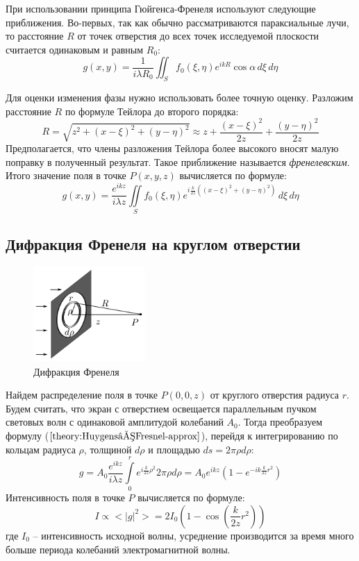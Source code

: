 При использовании принципа Гюйгенса-Френеля используют следующие приближения. Во-первых, так как обычно рассматриваются параксиальные лучи, то расстояние $R$ от точек отверстия до всех точек исследуемой плоскости считается одинаковым и равным $R_0$:
$$
g(x, y) = \frac{1}{i \lambda R_0} \iint_S f_0(\xi, \eta) e^{ikR} \cos \alpha  \, d\xi \, d\eta
$$

Для оценки изменения фазы нужно использовать более точную оценку. Разложим расстояние $R$ по формуле Тейлора до второго порядка:
$$
R = \sqrt{z^2 + (x - \xi)^2 + (y - \eta)^2} \approx z + \frac{(x - \xi)^2}{2 z} + \frac{(y - \eta)^2}{2z}
$$
Предполагается, что члены разложения Тейлора более высокого вносят малую поправку в полученный результат. Такое приближение называется \textit{френелевским}. Итого значение поля в точке $P(x, y, z)$ вычисляется по формуле:
\begin{equation}
	g(x, y) = \frac{e^{ikz}}{i \lambda z} \iint\limits_S f_0(\xi, \eta) e^{i\frac{k}{2z}\left((x-\xi)^2 + (y - \eta)^2\right)} \, d\xi \, d\eta
	\label{theory:Huygens–Fresnel-approx}
\end{equation}

\subsection*{Дифракция Френеля на круглом отверстии}

\begin{figure}
	\centering
	\includegraphics[width=0.38\textwidth]{../Изображения/Дифракция Френеля.png}
	\caption{Дифракция Френеля}
\end{figure}

Найдем распределение поля в точке $P(0, 0, z)$ от круглого отверстия радиуса $r$. Будем считать, что экран с отверстием освещается параллельным пучком световых волн с одинаковой амплитудой колебаний $A_0$. Тогда преобразуем формулу ($\ref{theory:Huygens–Fresnel-approx}$), перейдя к интегрированию по кольцам радиуса $\rho$, толщиной $d\rho$ и площадью $ds = 2 \pi \rho d \rho$:
$$
	g = A_0 \frac{e^{ikz}}{i \lambda z} \int \limits_0^r e^{i\frac{k}{2z} \rho^2} 2\pi \rho d \rho = A_0 e^{ikz} \left( 1 - e^{-ik\frac{k}{2z}r^2} \right)
$$
Интенсивность поля в точке $P$ вычисляется по формуле:
\begin{equation}
	I \propto <|g|^2> = 2I_0 \left(1 - \cos \left( \frac{k}{2z}r^2 \right)\right)
	\label{eq:Fresnels-intensity}
\end{equation}
где $I_0$ -- интенсивность исходной волны, усреднение производится за время много больше периода колебаний электромагнитной волны.

